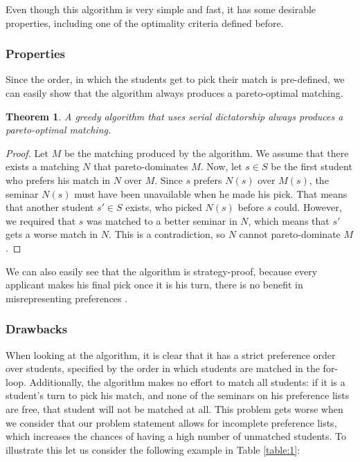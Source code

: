 Even though this algorithm is very simple and fast, it has some desirable properties, including one of the optimality criteria defined before.

\subsubsection{Properties}
Since the order, in which the students get to pick their match is pre-defined, we can easily show that the algorithm always produces a pareto-optimal matching.
\newtheorem{theorem}{Theorem}
\begin{theorem}
    A greedy algorithm that uses serial dictatorship always produces a pareto-optimal matching.
\end{theorem}
\begin{proof}
    Let $M$ be the matching produced by the algorithm. We assume that there exists a matching $N$ that pareto-dominates $M$. Now, let $s\in S$ be the first student who prefers his match in $N$ over $M$. Since $s$ prefers $N(s)$ over $M(s)$, the seminar $N(s)$ must have been unavailable when he made his pick. That means that another student $s' \in S$ exists, who picked $N(s)$ before $s$ could. However, we required that $s$ was matched to a better seminar in $N$, which means that $s'$ gets a worse match in $N$. This is a contradiction, so $N$ cannot pareto-dominate $M$ \cite{kun_2015}.
\end{proof}

We can also easily see that the algorithm is strategy-proof, because every applicant makes his final pick once it is his turn, there is no benefit in misrepresenting preferences \cite{Klaus}.

\subsubsection{Drawbacks}
When looking at the algorithm, it is clear that it has a strict preference order over students, specified by the order in which students are matched in the for-loop. Additionally, the algorithm makes no effort to match all students: if it is a student's turn to pick his match, and none of the seminars on his preference lists are free, that student will not be matched at all. This problem gets worse when we consider that our problem statement allows for incomplete preference lists, which increases the chances of having a high number of unmatched students. To illustrate this let us consider the following example in Table \ref{table:1}:

